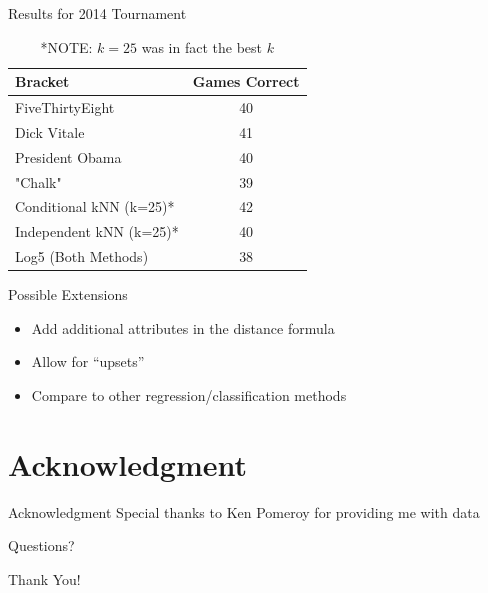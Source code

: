 \documentclass{beamer}
\begin{document}
\begin{frame}{Results for 2014 Tournament}

\begin{table}[!t]
 \centering
 \begin{tabular}{|l|c|}
  \hline
  Bracket & Games Correct\\
  \hline
  \hline
  FiveThirtyEight           & 40\\
  Dick Vitale               & 41\\
  President Obama           & 40\\
  "Chalk"                   & 39\\
  Conditional kNN (k=25)*   & 42\\
  Independent kNN (k=25)*   & 40\\
  Log5 (Both Methods)       & 38\\

\hline
\end{tabular}
\caption*{*NOTE: $k=25$ was in fact the best $k$}
\end{table}

\end{frame}

\begin{frame}{Possible Extensions}
\begin{itemize}
\item Add additional attributes in the distance formula
\item Allow for  “upsets”
\item Compare to other regression/classification methods

\end{itemize}
\end{frame}

\section*{Acknowledgment}

\begin{frame}{Acknowledgment}
Special thanks to Ken Pomeroy for providing me with data
\end{frame}

\begin{frame}{Questions?}
\huge
\centerline{Thank You!}
\end{frame}
\end{document}
